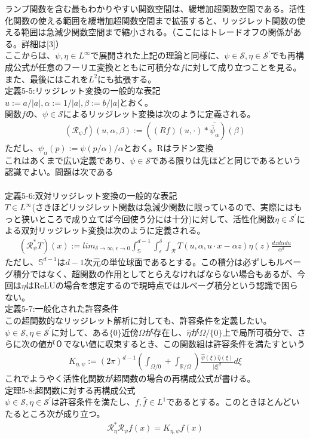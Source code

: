 \documentclass{jsarticle}
\begin{document}
ランプ関数を含む最もわかりやすい関数空間は、緩増加超関数空間である。活性化関数の使える範囲を緩増加超関数空間まで拡張すると、リッジレット関数の使える範囲は急減少関数空間まで縮小される。（ここにはトレードオフの関係がある。詳細は[3]）\\
ここからは、$\psi,\eta\in L^\infty$で展開された上記の理論と同様に、$\psi\in\mathcal{S},\eta\in\mathcal{S}^{'}$でも再構成公式が任意のフーリエ変換とともに可積分な$f$に対して成り立つことを見る。また、最後にはこれを$L^2$にも拡張する。\\
定義5-5:リッジレット変換の一般的な表記\\
$u:=a/|a|,\alpha:=1/|a|,\beta:=b/|a|$とおく。\\
関数$f$の、$\psi\in\mathcal{S}$によるリッジレット変換は次のように定義される。
\begin{eqnarray}
(\mathcal{R}_\psi f)(u,\alpha,\beta):=((Rf)(u,\cdot)*\overline{\tilde{\psi_\alpha}})(\beta)
\end{eqnarray}
ただし、$\psi_\alpha(p):=\psi(p/\alpha)/\alpha$とおく。Rはラドン変換\\
これはあくまで広い定義であり、$\psi\in\mathcal{S}$である限りは先ほどと同じであるという認識でよい。問題は次である\\
　\\
定義5-6:双対リッジレット変換の一般的な表記\\
$T\in L^\infty$(さきほどリッジレット関数は急減少関数に限っているので、実際にはもっと狭いところで成り立てば今回使う分には十分)に対して、活性化関数$\eta\in\mathcal{S}^{'}$による双対リッジレット変換は次のように定義される。
\begin{eqnarray}
(\mathcal{R}^*_\psi T)(x):=lim_{\delta\rightarrow\infty,\epsilon\rightarrow0}\int_\mathbb{S}^{d-1}\int_\epsilon^\delta\int_{\mathcal{R}}T(u,\alpha,u\cdot x-\alpha z)\eta(z)\frac{dzd\alpha du}{\alpha^d}
\end{eqnarray}
ただし、$\mathbb{S}^{d-1}$は$d-1$次元の単位球面であるとする。この積分は必ずしもルベーグ積分ではなく、超関数の作用としてとらえなければならない場合もあるが、今回は$\eta$はReLUの場合を想定するので現時点ではルベーグ積分という認識で困らない。\\
定義5-7:一般化された許容条件\\
この超関数的なリッジレット解析に対しても、許容条件を定義したい。\\
$\psi\in\mathcal{S},\eta\in\mathcal{S}^{'}$に対して、ある$\{0\}$近傍$\Omega$が存在し、$\hat{\eta}$が$\Omega/\{0\}$上で局所可積分で、さらに次の値が０でない値に収束するとき、この関数組は許容条件を満たすという
\begin{eqnarray}
K_{\eta,\psi}:=(2\pi)^{d-1}(\int_{\Omega/{0}}+\int_{\mathbb{R}/\Omega})\frac{\overline{\hat{\psi}(\xi)}\hat{\eta}(\xi)}{|\xi|^d}d\xi
\end{eqnarray}
これでようやく活性化関数が超関数の場合の再構成公式が書ける。\\
定理5-8:超関数に対する再構成公式\\
$\psi\in\mathcal{S},\eta\in\mathcal{S}^{'}$は許容条件を満たし、$f,\hat{f}\in L^1$であるとする。このときほとんどいたるところ次が成り立つ。
\begin{eqnarray}
\mathcal{R}^*_\eta \mathcal{R}_\psi f(x)=K_{\eta,\psi}f(x)
\end{eqnarray}
\end{document}
